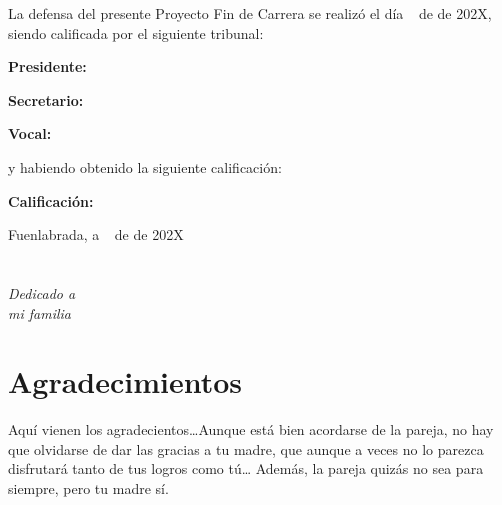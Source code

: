 \documentclass[a4paper, 12pt, oneside]{book}
\begin{document}
\vspace{1cm}
La defensa del presente Proyecto Fin de Carrera se realizó el día \qquad$\;\,$ de \qquad\qquad\qquad\qquad \newline de 202X, siendo calificada por el siguiente tribunal:


\vspace{0.5cm}
\textbf{Presidente:}

\vspace{1.2cm}
\textbf{Secretario:}

\vspace{1.2cm}
\textbf{Vocal:}


\vspace{1.2cm}
y habiendo obtenido la siguiente calificación:

\vspace{1cm}
\textbf{Calificación:}


\vspace{1cm}
\begin{flushright}
Fuenlabrada, a \qquad$\;\,$ de \qquad\qquad\qquad\qquad de 202X
\end{flushright}


\chapter*{}
\begin{flushright}
\textit{Dedicado a \\
mi familia}
\end{flushright}


\chapter*{Agradecimientos}

Aquí vienen los agradecientos\ldots Aunque está bien acordarse de la pareja, no hay que olvidarse de dar las gracias a tu madre, que aunque a veces no lo parezca disfrutará tanto de tus logros como tú\ldots 
Además, la pareja quizás no sea para siempre, pero tu madre sí.
\end{document}
